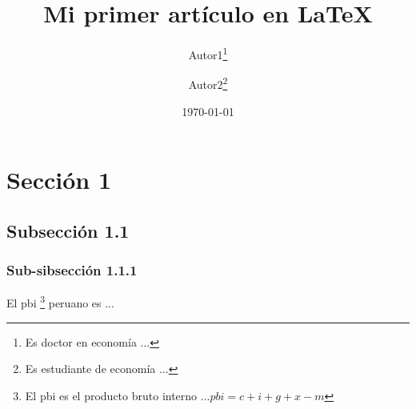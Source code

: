 \documentclass[12pt,a4paper]{article} %
\title{Mi primer artículo en \LaTeX}
\author{
         Autor1\thanks{Es doctor en economía ... } \and Autor2\thanks{Es estudiante de economía ...}
    }
\date{\today}
\begin{document}
    \maketitle
    \begin{abstract}
        \begin{multicols}{2}
            \lipsum[1] 
        \end{multicols}
    \end{abstract}
    \tableofcontents
    \section{Sección 1}
        \lipsum[1]
        \subsection{Subsección 1.1}
            \lipsum[1]
            \subsubsection{Sub-sibsección 1.1.1}
                \lipsum[1]
        El pbi \footnote{El pbi es el producto bruto interno ...$pbi = c + i + g + x -m$
        } peruano es ...
\end{document}

